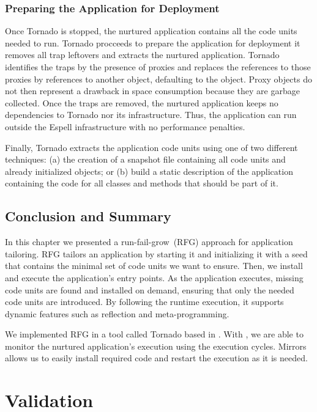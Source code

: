 \subsection{Preparing the Application for Deployment}\label{sec:deploy}

Once Tornado is stopped, the nurtured application contains all the code units needed to run. Tornado procceeds to prepare the application for deployment \ie it removes all trap leftovers and extracts the nurtured application. Tornado identifies the traps by the presence of proxies and replaces the references to those proxies by references to another object, defaulting to the  object. Proxy objects do not then represent a drawback in space consumption because they are garbage collected. Once the traps are removed, the nurtured application keeps no dependencies to Tornado nor its infrastructure. Thus, the application can run outside the Espell infrastructure with no performance penalties.

Finally, Tornado extracts the application code units using one of two different techniques: (a) the creation of a snapshot file containing all code units and already initialized objects; or (b) build a static description of the application containing the code for all classes and methods that should be part of it.

\section{Conclusion and Summary}

In this chapter we presented a run-fail-grow~(RFG) approach for application tailoring. RFG tailors an application by starting it and initializing it with a seed that contains the minimal set of code units we want to ensure. Then, we install and execute the application's entry points. As the application executes, missing code units are found and installed on demand, ensuring that only the needed code units are introduced. By following the runtime execution, it supports dynamic features such as reflection and meta-programming.

We implemented RFG in a tool called Tornado based in \Vtt. With \Vtt, we are able to monitor the nurtured application's execution using the execution cycles. Mirrors allows us to easily install required code and restart the execution as it is needed.

\chapter{Validation}

